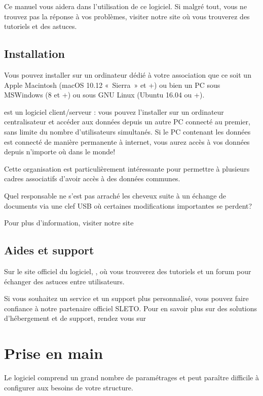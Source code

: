 \documentclass[a4paper,10pt,oneside,french]{sphinxmanual}
\begin{document}
\sphinxAtStartPar
Ce manuel vous aidera dans l’utilisation de ce logiciel.
Si malgré tout, vous ne trouvez pas la réponse à vos problèmes, visiter notre site  où vous trouverez des tutoriels et des astuces.


\subsection{Installation}
\label{\detokenize{asso/presentation:installation}}
\sphinxAtStartPar
Vous pouvez installer  sur un ordinateur dédié à votre association que ce soit un Apple Macintosh (macOS 10.12 « Sierra » et +) ou bien un PC sous MS\sphinxhyphen{}Windows (8 et +) ou sous GNU Linux (Ubuntu 16.04 ou +).

\sphinxAtStartPar
{} est un logiciel client/serveur : vous pouvez l’installer sur un ordinateur centralisateur et accéder aux données depuis un autre PC connecté au premier, sans limite du nombre d’utilisateurs simultanés.
Si le PC contenant les données est connecté de manière permanente à internet, vous aurez accès à vos données depuis n’importe où dans le monde!

\sphinxAtStartPar
Cette organisation est particulièrement intéressante pour permettre à plusieurs cadres associatifs d’avoir accès à des données communes.

\sphinxAtStartPar
Quel responsable ne s’est pas arraché les cheveux suite à un échange de documents via une clef USB où certaines modifications importantes se perdent?

\sphinxAtStartPar
Pour plus d’information, visiter notre site 


\subsection{Aides et support}
\label{\detokenize{asso/presentation:aides-et-support}}
\sphinxAtStartPar
Sur le site officiel du logiciel, , où vous trouverez des tutoriels et un forum pour échanger des astuces entre utilisateurs.

\sphinxAtStartPar
Si vous souhaitez un service et un support plus personnalisé, vous pouvez faire confiance à notre partenaire officiel SLETO.
Pour en savoir plus sur des solutions d’hébergement et de support, rendez vous sur 


\section{Prise en main}
\label{\detokenize{asso/first_step:prise-en-main}}\label{\detokenize{asso/first_step::doc}}
\sphinxAtStartPar
Le logiciel  comprend un grand nombre de paramétrages et peut paraître difficile à configurer aux besoins de votre structure.
\end{document}
